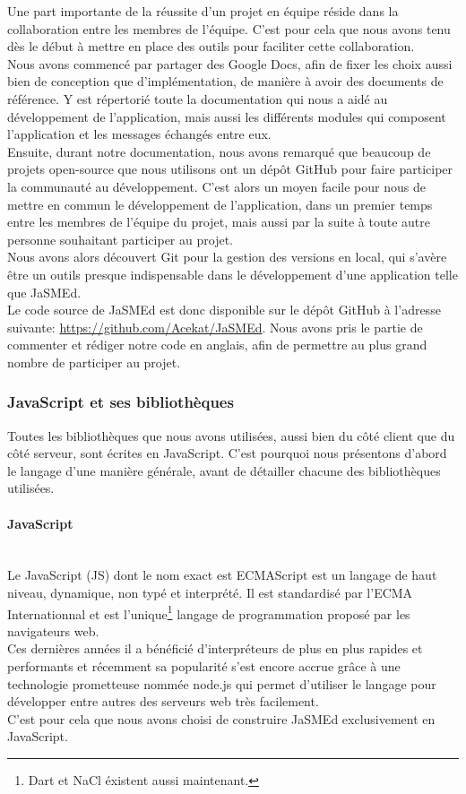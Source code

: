\documentclass[pdftex,12pt,a4paper]{article}
\begin{document}
Une part importante de la réussite d’un projet en équipe réside dans la collaboration entre les membres de l’équipe. C’est pour cela que nous avons tenu dès le début à mettre en place des outils pour faciliter cette collaboration.\\
Nous avons commencé par partager des Google Docs, afin de fixer les choix aussi bien de conception que d’implémentation, de manière à avoir des documents de référence. Y est répertorié toute la documentation qui nous a aidé au développement de l’application, mais aussi les différents modules qui composent l’application et les messages échangés entre eux.\\
Ensuite, durant notre documentation, nous avons remarqué que beaucoup de projets open-source que nous utilisons ont un dépôt GitHub pour faire participer la communauté au développement. C’est alors un moyen facile pour nous de mettre en commun le développement de l’application, dans un premier temps entre les membres de l’équipe du projet, mais aussi par la suite à toute autre personne souhaitant participer au projet.\\
Nous avons alors découvert Git pour la gestion des versions en local, qui s’avère être un outils presque indispensable dans le développement d’une application telle que JaSMEd.\\
Le code source de JaSMEd est donc disponible sur le dépôt GitHub à l’adresse suivante: \url{https://github.com/Acekat/JaSMEd}. Nous avons pris le partie de commenter et rédiger notre code en anglais, afin de permettre au plus grand nombre de participer au projet.

\subsubsection{JavaScript et ses bibliothèques}

Toutes les bibliothèques que nous avons utilisées, aussi bien du côté client que du côté serveur, sont écrites en JavaScript. C’est pourquoi nous présentons d’abord le langage d’une manière générale, avant de détailler chacune des bibliothèques utilisées.

\paragraph{JavaScript}~\\
Le JavaScript (JS) dont le nom exact est ECMAScript est un langage de haut niveau, dynamique, non typé et interprété. Il est standardisé par l’ECMA Internationnal et est l’unique\footnote{Dart et NaCl éxistent aussi maintenant.} langage de programmation proposé par les navigateurs web.\\
Ces dernières années il a bénéficié d’interpréteurs de plus en plus rapides et performants et récemment sa popularité s’est encore accrue grâce à une technologie prometteuse nommée node.js qui permet d’utiliser le langage pour développer entre autres des serveurs web très facilement.\\
C’est pour cela que nous avons choisi de construire JaSMEd exclusivement en JavaScript.
\end{document}
